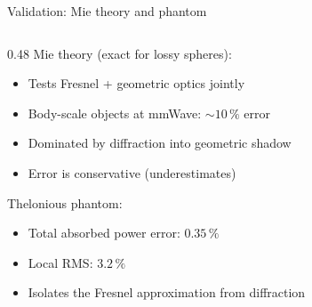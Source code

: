 \begin{frame}{Validation: Mie theory and phantom}
\hypertarget{sum-p1-validation}{}

  \begin{columns}[T]
    \begin{column}{0.48\textwidth}
      Mie theory (exact for lossy spheres):
      \begin{itemize}
        \item Tests Fresnel + geometric optics jointly
        \item Body-scale objects at mmWave: ${\sim}10\,\%$ error
        \item Dominated by diffraction into geometric shadow
        \item Error is conservative (underestimates)
      \end{itemize}

      \vspace{4pt}
      Thelonious phantom:
      \begin{itemize}
        \item Total absorbed power error: $0.35\,\%$
        \item Local RMS: $3.2\,\%$
        \item Isolates the Fresnel approximation from diffraction
      \end{itemize}
      {\footnotesize {}\;
       }
    \end{column}


\end{columns}
\end{frame}
